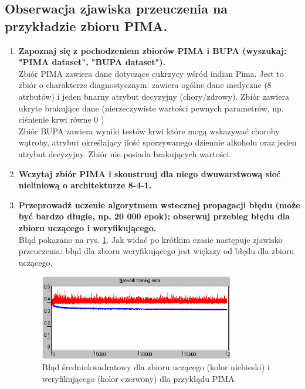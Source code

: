 \subsection{Obserwacja zjawiska przeuczenia na przykładzie zbioru PIMA.}
\begin{enumerate}
\item \textbf{ Zapoznaj się z pochodzeniem zbiorów PIMA i BUPA (wyszukaj: "PIMA dataset", "BUPA dataset").}
\\Zbiór PIMA zawiera dane dotyczące cukrzycy wśród indian Pima. Jest to zbiór o charakterze diagnostycznym: zawiera ogólne dane medyczne (8 atrbutów) i jeden bnarny atrybut decyzyjny (chory/zdrowy). Zbiór zawiera ukryte brakujące dane (nierzeczywiste wartości pewnych parametrów, np. ciśnienie krwi równe 0 )
\\Zbiór BUPA zawiera wyniki testów krwi które mogą wskazywać choroby wątroby, atrybut określający ilość sporzywanego dziennie alkoholu oraz jeden atrybut decyzyjny. Zbiór nie posiada brakujących wartości.

\item \textbf{
Wczytaj zbiór PIMA i skonstruuj dla niego dwuwarstwową sieć nieliniową o architekturze 8-4-1.}

\item \textbf{
Przeprowadź uczenie algorytmem wstecznej propagacji błędu (może być bardzo długie, np. 20 000 epok); obserwuj przebieg błędu dla zbioru uczącego i weryfikującego.}
\\Błąd pokazano na rys. \ref{fig:PIMA_error}. Jak widać po krótkim czasie następuje zjawisko przeuczenia: błąd dla zbioru weryfikującego jest większy od błędu dla zbioru uczącego.

\begin{figure}[h]
\centering
\includegraphics[width=0.8\textwidth]{dane/part1/zad3/error}
\caption{Błąd średniokwadratowy dla zbioru uczącego (kolor niebieski) i weryfikującego (kolor czerwony) dla przykłądu PIMA\label{fig:PIMA_error}}
\end{figure}
\end{enumerate}

